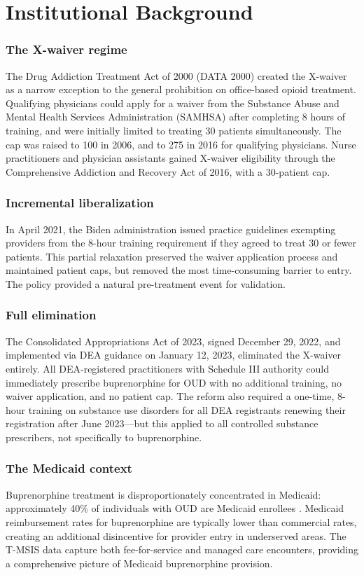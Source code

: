 \documentclass[12pt]{article}
\begin{document}
\section{Institutional Background}

\subsubsection*{The X-waiver regime} The Drug Addiction Treatment Act of 2000 (DATA 2000) created the X-waiver as a narrow exception to the general prohibition on office-based opioid treatment. Qualifying physicians could apply for a waiver from the Substance Abuse and Mental Health Services Administration (SAMHSA) after completing 8 hours of training, and were initially limited to treating 30 patients simultaneously. The cap was raised to 100 in 2006, and to 275 in 2016 for qualifying physicians. Nurse practitioners and physician assistants gained X-waiver eligibility through the Comprehensive Addiction and Recovery Act of 2016, with a 30-patient cap.

\subsubsection*{Incremental liberalization} In April 2021, the Biden administration issued practice guidelines exempting providers from the 8-hour training requirement if they agreed to treat 30 or fewer patients. This partial relaxation preserved the waiver application process and maintained patient caps, but removed the most time-consuming barrier to entry. The policy provided a natural pre-treatment event for validation.

\subsubsection*{Full elimination} The Consolidated Appropriations Act of 2023, signed December 29, 2022, and implemented via DEA guidance on January 12, 2023, eliminated the X-waiver entirely. All DEA-registered practitioners with Schedule III authority could immediately prescribe buprenorphine for OUD with no additional training, no waiver application, and no patient cap. The reform also required a one-time, 8-hour training on substance use disorders for all DEA registrants renewing their registration after June 2023---but this applied to all controlled substance prescribers, not specifically to buprenorphine.

\subsubsection*{The Medicaid context} Buprenorphine treatment is disproportionately concentrated in Medicaid: approximately 40\% of individuals with OUD are Medicaid enrollees \citep{mark2015}. Medicaid reimbursement rates for buprenorphine are typically lower than commercial rates, creating an additional disincentive for provider entry in underserved areas. The T-MSIS data capture both fee-for-service and managed care encounters, providing a comprehensive picture of Medicaid buprenorphine provision.
\end{document}
